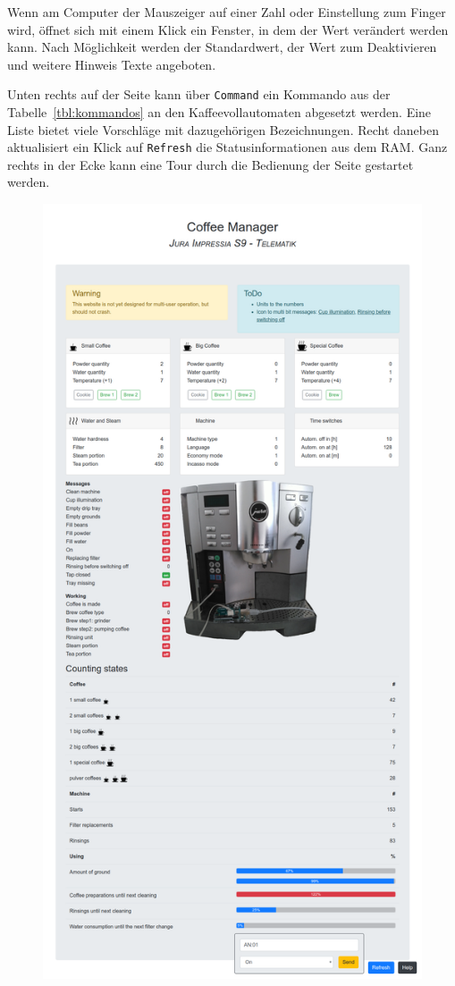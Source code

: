 Wenn am Computer der Mauszeiger auf einer Zahl oder Einstellung zum Finger wird, öffnet sich mit einem Klick ein Fenster, in dem der Wert verändert werden kann.
Nach Möglichkeit werden der Standardwert, der Wert zum Deaktivieren und weitere Hinweis Texte angeboten.

Unten rechts auf der Seite kann über \texttt{Command} ein Kommando aus der Tabelle~\ref{tbl:kommandos} an den Kaffeevollautomaten abgesetzt werden.
Eine Liste bietet viele Vorschläge mit dazugehörigen Bezeichnungen.
Recht daneben aktualisiert ein Klick auf \texttt{Refresh} die Statusinformationen aus dem \ac{RAM}.
Ganz rechts in der Ecke kann eine Tour durch die Bedienung der Seite gestartet werden.

\begin{figure}
  \begin{center}
    \includegraphics[scale=0.25]{images/chapter_4/Webseite}

\end{center}
\end{figure}
